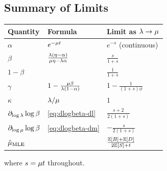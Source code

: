 


\subsection{Summary of Limits}

\begin{center}
\begin{tabular}{lll}
\hline
\textbf{Quantity} & \textbf{Formula} & \textbf{Limit as $\lambda \to \mu$} \\
\hline
$\alpha$ & $e^{-\mu t}$ & $e^{-s}$ (continuous) \\
$\beta$ & $\frac{\lambda(\eta-\alpha)}{\mu\eta - \lambda\alpha}$
  & $\frac{s}{1+s}$ \\
$1-\beta$ & & $\frac{1}{1+s}$ \\
$\gamma$ & $1 - \frac{\mu\beta}{\lambda(1-\alpha)}$
  & $1 - \frac{1}{(1+s)\phi}$ \\
$\kappa$ & $\lambda/\mu$ & $1$ \\
$\partial_{\log\lambda}\log\beta$
  & \eqref{eq:dlogbeta-dl}
  & $\frac{s+2}{2(1+s)}$ \\
$\partial_{\log\mu}\log\beta$
  & \eqref{eq:dlogbeta-dm}
  & $-\frac{s}{2(1+s)}$ \\
$\hat{\mu}_{\text{MLE}}$ & &
  $\frac{\mathbb{E}[B]+\mathbb{E}[D]}{2\mathbb{E}[S]+t}$ \\
\hline
\end{tabular}
\end{center}

where $s = \mu t$ throughout.
